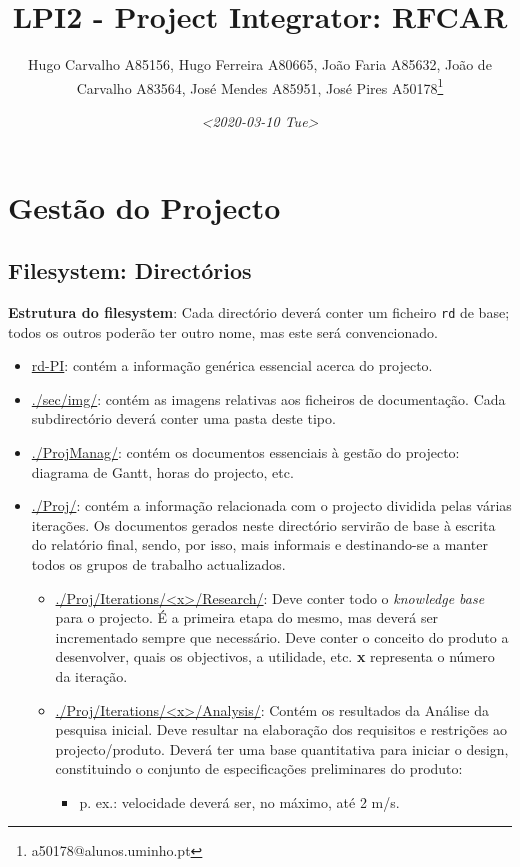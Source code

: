 \documentclass[11pt]{article}
\author{Hugo Carvalho A85156, Hugo Ferreira A80665, João Faria A85632, João de Carvalho A83564, José Mendes A85951, José Pires A50178\thanks{a50178@alunos.uminho.pt}}
\date{\textit{<2020-03-10 Tue>}}
\title{LPI2 - Project Integrator: RFCAR}
\begin{document}
\maketitle
\tableofcontents


\section{Gestão do Projecto}
\label{sec:org6b887bc}
\subsection{Filesystem: Directórios}
\label{sec:org675f262}
\textbf{Estrutura do filesystem}: Cada directório deverá conter um ficheiro \texttt{rd} de
 base; todos os outros poderão ter outro nome, mas este será convencionado.
\begin{itemize}
\item \href{rd-PI.org}{rd-PI}: contém a informação genérica essencial acerca do projecto.
\item \href{sec/img}{./sec/img/}: contém as imagens relativas aos ficheiros de documentação. Cada
subdirectório deverá conter uma pasta deste tipo.
\item \href{ProjManag}{./ProjManag/}: contém os documentos essenciais à gestão do projecto: diagrama
de Gantt, horas do projecto, etc.
\item \href{Proj}{./Proj/}: contém a informação relacionada com o projecto dividida pelas várias
iterações. Os documentos gerados neste directório servirão de base à escrita
do relatório final, sendo, por isso, mais informais e destinando-se a manter
todos os grupos de trabalho actualizados.
\begin{itemize}
\item \href{Pesquisa}{./Proj/Iterations/<x>/Research/}: Deve conter todo o \emph{knowledge base} para o
projecto. É a primeira  etapa do mesmo, mas deverá ser incrementado sempre
que necessário. Deve conter o conceito do produto a desenvolver, quais os
objectivos, a utilidade, etc. \textbf{x} representa o número da iteração.
\item \href{Analise}{./Proj/Iterations/<x>/Analysis/}: Contém os resultados da Análise da pesquisa
inicial. Deve resultar na elaboração dos requisitos e restrições ao
projecto/produto. Deverá ter uma base quantitativa para iniciar o design,
constituindo o conjunto de especificações preliminares do produto:
\begin{itemize}
\item p. ex.: velocidade deverá ser, no máximo, até 2 m/s.

\end{itemize}
\end{itemize}
\end{itemize}
\end{document}
